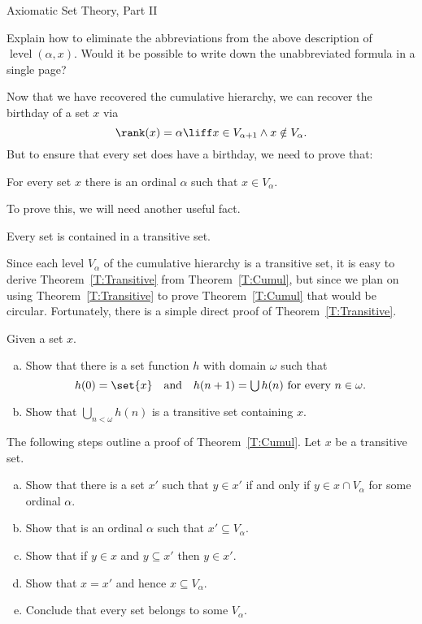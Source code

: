 \begin{unit}{Axiomatic Set Theory, Part II}
\begin{problem}
  Explain how to eliminate the abbreviations from the above description of \(\operatorname{level}(\alpha,x).\)
  Would it be possible to write down the unabbreviated formula in a single page?
\end{problem}

Now that we have recovered the cumulative hierarchy, we can recover the birthday of a set \(x\) via \[\rank(x) = \alpha \liff x \in V_{\alpha+1} \land x \notin V_\alpha.\]
But to ensure that every set does have a birthday, we need to prove that:

\begin{theorem}\label{T:Cumul}
  For every set \(x\) there is an ordinal \(\alpha\) such that \(x \in V_\alpha.\)
\end{theorem}

\noindent
To prove this, we will need another useful fact.

\begin{theorem}\label{T:Transitive}
  Every set is contained in a transitive set.
\end{theorem}

Since each level \(V_\alpha\) of the cumulative hierarchy is a transitive set, it is easy to derive Theorem~\ref{T:Transitive} from Theorem~\ref{T:Cumul}, but since we plan on using Theorem~\ref{T:Transitive} to prove Theorem~\ref{T:Cumul} that would be circular.
Fortunately, there is a simple direct proof of Theorem~\ref{T:Transitive}.

\begin{problem}
  Given a set \(x.\)
  \begin{enumerate}[(a)]
  \item Show that there is a set function \(h\) with domain \(\omega\) such that \[h(0) = \set{x} \quad\text{and}\quad h(n+1) = {\textstyle\bigcup h(n)}\ \text{for every}\ n \in \omega.\]
  \item Show that \(\bigcup_{n<\omega} h(n)\) is a transitive set containing \(x.\)
  \end{enumerate}
\end{problem}

\begin{problem}
  The following steps outline a proof of Theorem~\ref{T:Cumul}.
  Let \(x\) be a transitive set.
  \begin{enumerate}[(a)]
  \item Show that there is a set \(x'\) such that \(y \in x'\) if and only if \(y \in x \cap V_\alpha\) for some ordinal \(\alpha.\)
  \item Show that  is an ordinal \(\alpha\) such that \(x' \subseteq V_\alpha.\)
  \item Show that if \(y \in x\) and \(y \subseteq x'\) then \(y \in x'.\)
  \item Show that \(x = x'\) and hence \(x \subseteq V_\alpha.\)
  \item Conclude that every set belongs to some \(V_\alpha.\)
  \end{enumerate}
\end{problem}

\end{unit}
\endinput
